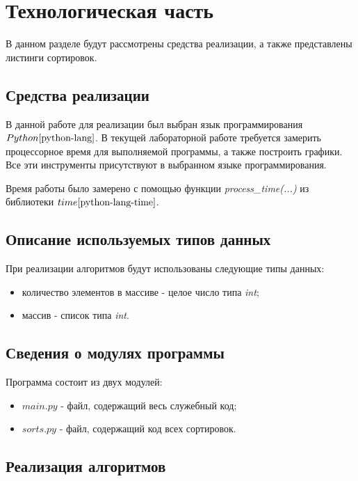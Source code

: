 \chapter{Технологическая часть}

В данном разделе будут рассмотрены средства реализации, а также представлены листинги сортировок.

\section{Средства реализации}
В данной работе для реализации был выбран язык программирования $Python \cite{python-lang}$. В текущей лабораторной работе требуется замерить процессорное время для выполняемой программы, а также построить графики. Все эти инструменты присутствуют в выбранном языке программирования.

Время работы было замерено с помощью функции \textit{process\_time(...)} из библиотеки $time \cite{python-lang-time}$.

\section{Описание используемых типов данных}

При реализации алгоритмов будут использованы следующие типы данных:

\begin{itemize}
	\item количество элементов в массиве - целое число типа \textit{int};
	\item массив - список типа \textit{int}.
\end{itemize}

\section{Сведения о модулях программы}
Программа состоит из двух модулей:
\begin{itemize}
	\item $main.py$ - файл, содержащий весь служебный код;
    \item $sorts.py$ - файл, содержащий код всех сортировок. \newline
\end{itemize}


\section{Реализация алгоритмов}

